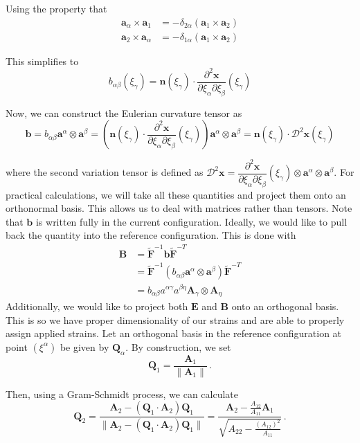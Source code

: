 \documentclass[11pt]{article}
\theoremstyle{plain}
\theoremstyle{definition}
\begin{document}
Using the property that
\[
\begin{split}
\mathbf{a}_\alpha \times \mathbf{a}_1 &= - \delta_{2\alpha} (\mathbf{a}_1 \times \mathbf{a}_2) \\
\mathbf{a}_{2} \times \mathbf{a}_\alpha &= - \delta_{1\alpha} (\mathbf{a}_1 \times \mathbf{a}_2)
\end{split}
\]

This simplifies to
\[
b_{\alpha \beta}(\xi_\gamma) = \mathbf{n}(\xi_\gamma) \cdot \dfrac{\partial^2 \mathbf{x}}{\partial \xi_\alpha \partial \xi_\beta} (\xi_\gamma)
\]

Now, we can construct the Eulerian curvature tensor as
\[
\mathbf{b} = b_{\alpha \beta} \mathbf{a}^\alpha \otimes \mathbf{a}^\beta = \left(\mathbf{n}(\xi_\gamma) \cdot \dfrac{\partial^2 \mathbf{x}}{\partial \xi_\alpha \partial \xi_\beta} (\xi_\gamma) \right)\mathbf{a}^\alpha \otimes \mathbf{a}^\beta = \mathbf{n}(\xi_\gamma) \cdot \mathcal{D}^2 \mathbf{x}(\xi_\gamma)
\]

where the second variation tensor is defined as $\mathcal{D}^2 \mathbf{x} = \dfrac{\partial^2 \mathbf{x}}{\partial \xi_\alpha \partial \xi_\beta} (\xi_\gamma)\otimes \mathbf{a}^\alpha \otimes \mathbf{a}^\beta$. For practical calculations, we will take all these quantities and project them onto an orthonormal basis. This allows us to deal with matrices rather than tensors. Note that $\mathbf{b}$ is written fully in the current configuration. Ideally, we would like to pull back the quantity into the reference configuration. This is done with
\[
\begin{split}
\mathbf{B} &= \mathbf{\tilde{F}}^{-1} \mathbf{b} \mathbf{\tilde{F}}^{-T}\\
&= \mathbf{\tilde{F}}^{-1} \left(b_{\alpha \beta} \mathbf{a}^\alpha \otimes \mathbf{a}^\beta \right) \mathbf{\tilde{F}}^{-T} \\
&= b_{\alpha \beta} a^{\alpha \gamma} a^{\beta \eta} \mathbf{A}_{\gamma} \otimes \mathbf{A}_{\eta}
\end{split}
\]
Additionally, we would like to project both $\mathbf{E}$ and $\mathbf{B}$ onto an orthogonal basis. This is so we have proper dimensionality of our strains and are able to properly assign applied strains. Let an orthogonal basis in the reference configuration at point $(\xi^\alpha)$ be given by $\mathbf{Q}_\alpha$. By construction, we set
\[
\mathbf{Q}_1 = \frac{\mathbf{A}_1}{ \| \mathbf{A}_1 \|} \, .
\]

Then, using a Gram-Schmidt process, we can calculate
\[
\mathbf{Q}_2 = \frac{\mathbf{A}_2 - (\mathbf{Q}_1 \cdot \mathbf{A}_2)\mathbf{Q}_1}{\|\mathbf{A}_2 - (\mathbf{Q}_1 \cdot \mathbf{A}_2)\mathbf{Q}_1 \|} = \frac{\mathbf{A}_2 - \frac{A_{12}}{A_{11}}\mathbf{A}_1}{\sqrt{A_{22} - \frac{\left(A_{12}\right)^2}{A_{11}}}} \, .
\]
\end{document}
